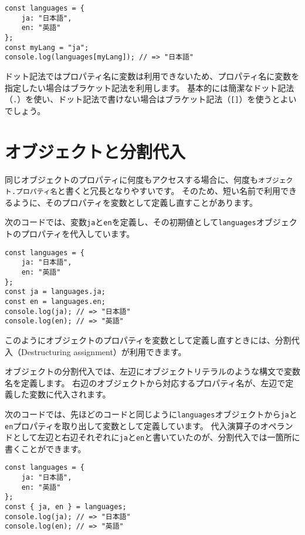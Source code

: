 \begin{lstlisting}
const languages = {
    ja: "日本語",
    en: "英語"
};
const myLang = "ja";
console.log(languages[myLang]); // => "日本語"
\end{lstlisting}

ドット記法ではプロパティ名に変数は利用できないため、プロパティ名に変数を指定したい場合はブラケット記法を利用します。
基本的には簡潔なドット記法（\texttt{.}）を使い、ドット記法で書けない場合はブラケット記法（\texttt{[]}）を使うとよいでしょう。

\hypertarget{object-destructuring}{%
\section[オブジェクトと分割代入]{オブジェクトと分割代入\,\protect{}}\label{object-destructuring}}

同じオブジェクトのプロパティに何度もアクセスする場合に、何度も\texttt{オブジェクト.\hbox{}プロパティ名}と書くと冗長となりやすいです。
そのため、短い名前で利用できるように、そのプロパティを変数として定義し直すことがあります。

次のコードでは、変数\texttt{ja}と\texttt{en}を定義し、その初期値として\texttt{languages}オブジェクトのプロパティを代入しています。

\begin{lstlisting}
const languages = {
    ja: "日本語",
    en: "英語"
};
const ja = languages.ja;
const en = languages.en;
console.log(ja); // => "日本語"
console.log(en); // => "英語"
\end{lstlisting}

このようにオブジェクトのプロパティを変数として定義し直すときには、分割代入（Destructuring
assignment）が利用できます。

オブジェクトの分割代入では、左辺にオブジェクトリテラルのような構文で変数名を定義します。
右辺のオブジェクトから対応するプロパティ名が、左辺で定義した変数に代入されます。

次のコードでは、先ほどのコードと同じように\texttt{languages}オブジェクトから\texttt{ja}と\texttt{en}プロパティを取り出して変数として定義しています。
代入演算子のオペランドとして左辺と右辺それぞれに\texttt{ja}と\texttt{en}と書いていたのが、分割代入では一箇所に書くことができます。

\begin{lstlisting}
const languages = {
    ja: "日本語",
    en: "英語"
};
const { ja, en } = languages;
console.log(ja); // => "日本語"
console.log(en); // => "英語"
\end{lstlisting}

